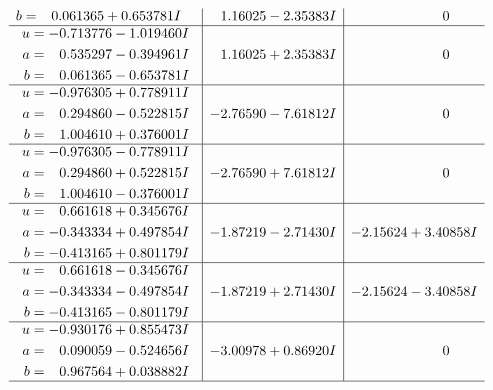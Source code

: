 \documentclass[1p]{elsarticle_modified}
\theoremstyle{definition}
\begin{document}
$$\begin{array}{c|c|c}
\begin{aligned}
b &= \phantom{-}0.061365 + 0.653781 I\end{aligned}
 & \phantom{-}1.16025 - 2.35383 I & \phantom{-0.000000 } 0 \\ \hline\begin{aligned}
u &= -0.713776 - 1.019460 I \\
a &= \phantom{-}0.535297 - 0.394961 I \\
b &= \phantom{-}0.061365 - 0.653781 I\end{aligned}
 & \phantom{-}1.16025 + 2.35383 I & \phantom{-0.000000 } 0 \\ \hline\begin{aligned}
u &= -0.976305 + 0.778911 I \\
a &= \phantom{-}0.294860 - 0.522815 I \\
b &= \phantom{-}1.004610 + 0.376001 I\end{aligned}
 & -2.76590 - 7.61812 I & \phantom{-0.000000 } 0 \\ \hline\begin{aligned}
u &= -0.976305 - 0.778911 I \\
a &= \phantom{-}0.294860 + 0.522815 I \\
b &= \phantom{-}1.004610 - 0.376001 I\end{aligned}
 & -2.76590 + 7.61812 I & \phantom{-0.000000 } 0 \\ \hline\begin{aligned}
u &= \phantom{-}0.661618 + 0.345676 I \\
a &= -0.343334 + 0.497854 I \\
b &= -0.413165 + 0.801179 I\end{aligned}
 & -1.87219 - 2.71430 I & -2.15624 + 3.40858 I \\ \hline\begin{aligned}
u &= \phantom{-}0.661618 - 0.345676 I \\
a &= -0.343334 - 0.497854 I \\
b &= -0.413165 - 0.801179 I\end{aligned}
 & -1.87219 + 2.71430 I & -2.15624 - 3.40858 I \\ \hline\begin{aligned}
u &= -0.930176 + 0.855473 I \\
a &= \phantom{-}0.090059 - 0.524656 I \\
b &= \phantom{-}0.967564 + 0.038882 I\end{aligned}
 & -3.00978 + 0.86920 I & \phantom{-0.000000 } 0\\
 \hline 
 \end{array}$$\newpage$$\begin{array}{c|c|c}  

\end{array}$$
\end{document}
